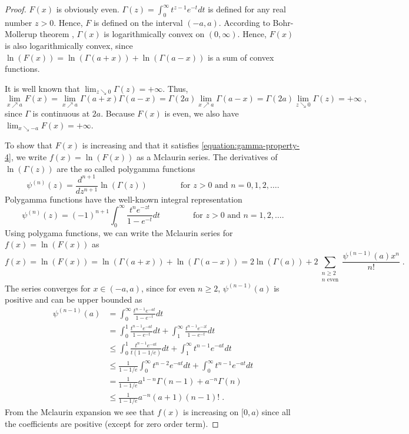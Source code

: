 \begin{proof}
$F(x)$ is obviously even. $\Gamma(z) = \int_0^\infty t^{z-1} e^{-t} dt$ is
defined for any real number $z > 0$. Hence, $F$ is defined on the interval
$(-a,a)$. According to Bohr-Mollerup theorem \cite[Theorem 2.1]{Artin-1964},
$\Gamma(x)$ is logarithmically convex on $(0,\infty)$. Hence, $F(x)$ is also
logarithmically convex, since $\ln (F(x)) = \ln(\Gamma(a+x)) +
\ln(\Gamma(a-x))$ is a sum of convex functions.

It is well known that $\lim_{z \searrow 0} \Gamma(z) = +\infty$. Thus,
\[
\lim_{x \nearrow a} F(x)
= \lim_{x \nearrow a} \Gamma(a+x) \Gamma(a-x)
= \Gamma(2a) \lim_{x \nearrow a} \Gamma(a-x)
= \Gamma(2a) \lim_{z \searrow 0} \Gamma(z)
= + \infty \; ,
\]
since $\Gamma$ is continuous at $2a$. Because $F(x)$ is even, we also have
$\lim_{x \searrow -a} F(x) = +\infty$.

To show that $F(x)$ is increasing and that it satisfies
\eqref{equation:gamma-property-4}, we write $f(x) = \ln(F(x))$ as a Mclaurin series.
The derivatives of $\ln(\Gamma(z))$ are the so called polygamma functions
\[
\psi^{(n)}(z) = \frac{d^{n+1}}{dz^{n+1}} \ln(\Gamma(z))
\qquad \qquad \text{for $z > 0$ and $n=0,1,2,\dots$.}
\]
Polygamma functions have the well-known integral representation
\[
\psi^{(n)}(z) = (-1)^{n+1} \int_0^\infty \frac{t^n e^{-zt}}{1 - e^{-t}} dt
\qquad \qquad \text{for $z > 0$ and $n=1,2,\dots$.}
\]
Using polygama functions, we can write the Mclaurin series for $f(x) = \ln(F(x))$ as
\[
f(x) = \ln(F(x)) = \ln(\Gamma(a+x)) + \ln(\Gamma(a-x)) = 2 \ln(\Gamma(a)) + 2 \sum_{\substack{n \ge 2 \\ \text{$n$ even}}} \frac{\psi^{(n-1)}(a) x^n}{n!} \; .
\]
The series converges for $x \in (-a,a)$, since
for even $n \ge 2$, $\psi^{(n-1)}(a)$ is positive and can be upper bounded as
\begin{align*}
\psi^{(n-1)}(a)
& = \int_0^\infty \frac{t^{n-1} e^{-at}}{1 - e^{-t}} dt \\
& = \int_0^1 \frac{t^{n-1} e^{-at}}{1 - e^{-t}} dt + \int_1^\infty \frac{t^{n-1} e^{-zt}}{1 - e^{-t}} dt \\
& \le \int_0^1 \frac{t^{n-1} e^{-at}}{t(1 - 1/e)} dt + \int_1^\infty t^{n-1} e^{-at} dt \\
& \le \frac{1}{1 - 1/e} \int_0^\infty t^{n-2} e^{-at} dt + \int_0^\infty t^{n-1} e^{-at} dt \\
& = \frac{1}{1 - 1/e} a^{1-n} \Gamma(n-1) + a^{-n} \Gamma(n) \\
& \le \frac{1}{1 - 1/e} a^{-n}(a+1) (n-1)!\; .
\end{align*}
From the Mclaurin expansion we see that $f(x)$ is increasing on $[0,a)$
since all the coefficients are positive (except for zero order term).


\end{proof}

